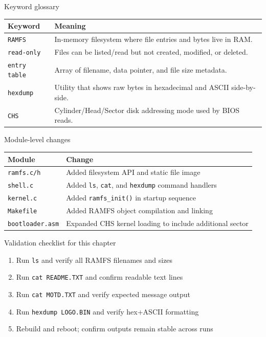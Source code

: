 \documentclass[aspectratio=169]{beamer}
\begin{document}
\begin{frame}{Keyword glossary}
  \small
  \begin{tabular}{@{}p{3.0cm}p{9.0cm}@{}}
    \toprule
    \textbf{Keyword} & \textbf{Meaning} \\
    \midrule
    \texttt{RAMFS} & In-memory filesystem where file entries and bytes live in RAM. \\
    \texttt{read-only} & Files can be listed/read but not created, modified, or deleted. \\
    \texttt{entry table} & Array of filename, data pointer, and file size metadata. \\
    \texttt{hexdump} & Utility that shows raw bytes in hexadecimal and ASCII side-by-side. \\
    \texttt{CHS} & Cylinder/Head/Sector disk addressing mode used by BIOS reads. \\
    \bottomrule
  \end{tabular}
\end{frame}

\begin{frame}{Module-level changes}
  \small
  \begin{tabular}{@{}p{2.8cm}p{9.2cm}@{}}
    \toprule
    \textbf{Module} & \textbf{Change} \\
    \midrule
    \texttt{ramfs.c/h} & Added filesystem API and static file image \\
    \texttt{shell.c} & Added \texttt{ls}, \texttt{cat}, and \texttt{hexdump} command handlers \\
    \texttt{kernel.c} & Added \texttt{ramfs\_init()} in startup sequence \\
    \texttt{Makefile} & Added RAMFS object compilation and linking \\
    \texttt{bootloader.asm} & Expanded CHS kernel loading to include additional sector \\
    \bottomrule
  \end{tabular}
\end{frame}

\begin{frame}{Validation checklist for this chapter}
  \begin{enumerate}
    \item Run \texttt{ls} and verify all RAMFS filenames and sizes
    \item Run \texttt{cat README.TXT} and confirm readable text lines
    \item Run \texttt{cat MOTD.TXT} and verify expected message output
    \item Run \texttt{hexdump LOGO.BIN} and verify hex+ASCII formatting
    \item Rebuild and reboot; confirm outputs remain stable across runs
  \end{enumerate}
\end{frame}
\end{document}
